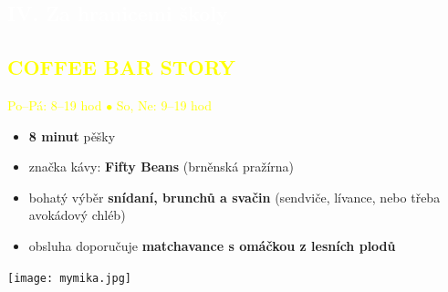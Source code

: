 \documentclass[a5paper, twoside]{article}
\newcommand{\polonadpis}[4]{
  \vspace*{-50pt}
  \begin{tcolorbox}[colback = #2, boxrule = 0pt, grow to left by = #4,  grow to right by = #4, arc=8pt, height = 30pt]
    \vspace*{5pt}
    \centering \subsection*{\textcolor{#3}{#1}}
  \end{tcolorbox}
}
\newcommand{\podnadpis}[2]{
  \subsection*{\textcolor{#2}{#1}}
}
\begin{document}
\pagebreak
\polonadpis{IV. Za hranicemi školy}{yellow}{white}{-3.8cm}

\noindent
\begin{minipage}{0.7\textwidth}
	\podnadpis{COFFEE BAR STORY}{yellow}
	\textcolor{yellow}{Po--Pá: 8--19 hod $\bullet$ So, Ne: 9--19 hod}
	\vspace{5pt}
	\small
	\begin{itemize}[leftmargin=10pt]
		\item \textbf{8 minut} pěšky
		\item značka kávy: \textbf{Fifty Beans} (brněnská pražírna)
		\item bohatý výběr \textbf{snídaní, brunchů a svačin} (sendviče, lívance, nebo třeba avokádový chléb)
		\item obsluha doporučuje \textbf{matchavance s omáčkou z lesních plodů}
	\end{itemize}
\end{minipage}
\hfill
\begin{minipage}{0.27\textwidth}
	\texttt{[image: mymika.jpg]}
\end{minipage}
\end{document}
